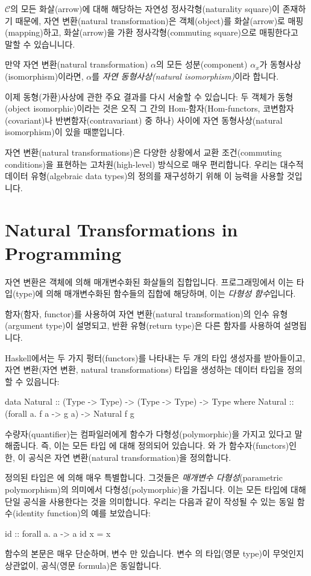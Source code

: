\documentclass[DaoFP]{subfiles}
\begin{document}
$\mathcal{C}$의 모든 화살(arrow)에 대해 해당하는 자연성 정사각형(naturality square)이 존재하기 때문에, 자연 변환(natural transformation)은 객체(object)를 화살(arrow)로 매핑(mapping)하고, 화살(arrow)을 가환 정사각형(commuting square)으로 매핑한다고 말할 수 있습니니다.

만약 자연 변환(natural transformation) $\alpha$의 모든 성분(component) $\alpha_x$가 동형사상(isomorphism)이라면, $\alpha$를 \emph{자연 동형사상(natural isomorphism)}이라 합니다.

이제 동형(가환)사상에 관한 주요 결과를 다시 서술할 수 있습니다: 두 객체가 동형(object isomorphic)이라는 것은 오직 그 간의 Hom-함자(Hom-functors, 코변함자(covariant)나 반변함자(contravariant) 중 하나) 사이에 자연 동형사상(natural isomorphism)이 있을 때뿐입니다.

자연 변환(natural transformations)은 다양한 상황에서 교환 조건(commuting conditions)을 표현하는 고차원(high-level) 방식으로 매우 편리합니다. 우리는 대수적 데이터 유형(algebraic data types)의 정의를 재구성하기 위해 이 능력을 사용할 것입니다.

\section{Natural Transformations in Programming}

자연 변환은 객체에 의해 매개변수화된 화살들의 집합입니다. 프로그래밍에서 이는 타입(type)에 의해 매개변수화된 함수들의 집합에 해당하며, 이는 \emph{다형성 함수}입니다.

함자(함자, functor)를 사용하여 자연 변환(natural transformation)의 인수 유형(argument type)이 설명되고, 반환 유형(return type)은 다른 함자를 사용하여 설명됩니다.

Haskell에서는 두 가지 펑터(functors)를 나타내는 두 개의 타입 생성자를 받아들이고, 자연 변환(자연 변환, natural transformations) 타입을 생성하는 데이터 타입을 정의할 수 있읍니다:

\begin{haskell}
data Natural :: (Type -> Type) -> (Type -> Type) -> Type where
  Natural :: (forall a. f a -> g a) -> Natural f g
\end{haskell}
 수량자(quantifier)는 컴파일러에게 함수가 다형성(polymorphic)을 가지고 있다고 말해줍니다. 즉, 이는 모든 타입 에 대해 정의되어 있습니다. 와 가 함수자(functors)인 한, 이 공식은 자연 변환(natural transformation)을 정의합니다.

정의된 타입은 에 의해 매우 특별합니다. 그것들은 \emph{매개변수 다형성}(parametric polymorphism)의 의미에서 다형성(polymorphic)을 가집니다. 이는 모든 타입에 대해 단일 공식을 사용한다는 것을 의미합니다. 우리는 다음과 같이 작성될 수 있는 동일 함수(identity function)의 예를 보았습니다:
\begin{haskell}
id :: forall a. a -> a
id x = x
\end{haskell}
함수의 본문은 매우 단순하며, 변수 만 있습니다. 변수 의 타입(영문 type)이 무엇인지 상관없이, 공식(영문 formula)은 동일합니다.
\end{document}
